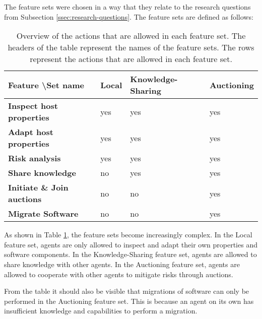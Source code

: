 The feature sets were chosen in a way that they relate to the research questions from Subsection \ref{ssec:research-questions}. The feature sets are defined as follows:

\begin{table}[H]
        \centering
        \begin{tabular}{l|l|l|l}
            \textbf{Feature \textbackslash Set name} & \textbf{Local} & \textbf{Knowledge-Sharing} & \textbf{Auctioning} \\ \hline
            \textbf{Inspect host properties}     & yes            & yes                        & yes                 \\
            \textbf{Adapt host properties}       & yes            & yes                        & yes                 \\
            \textbf{Risk analysis}               & yes            & yes                        & yes                 \\
            \textbf{Share knowledge}             & no             & yes                        & yes                 \\
            \textbf{Initiate \& Join auctions}   & no             & no                         & yes                 \\
            \textbf{Migrate Software}            & no             & no                         & yes                            
        \end{tabular}
        \caption{\label{table:experiment-features}Overview of the actions that are allowed in each feature set. The headers of the table represent the names of the feature sets. The rows represent the actions that are allowed in each feature set.}
\end{table}

As shown in Table \ref{table:experiment-features}, the feature sets become increasingly complex. In the Local feature set, agents are only allowed to inspect and adapt their own properties and software components. In the Knowledge-Sharing feature set, agents are allowed to share knowledge with other agents. In the Auctioning feature set, agents are allowed to cooperate with other agents to mitigate risks through auctions.

From the table it should also be visible that migrations of software can only be performed in the Auctioning feature set. This is because an agent on its own has insufficient knowledge and capabilities to perform a migration.

